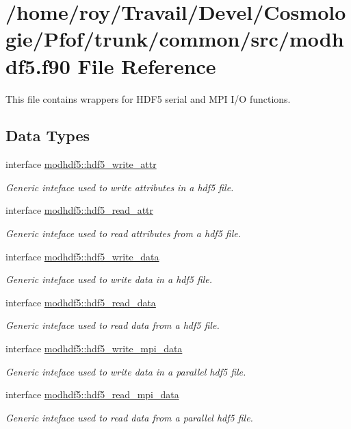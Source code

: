 \hypertarget{modhdf5_8f90}{}\section{/home/roy/\+Travail/\+Devel/\+Cosmologie/\+Pfof/trunk/common/src/modhdf5.f90 File Reference}
\label{modhdf5_8f90}


This file contains wrappers for H\+D\+F5 serial and M\+PI I/O functions.  


\subsection*{Data Types}
\begin{DoxyCompactItemize}
\item 
interface \hyperlink{interfacemodhdf5_1_1hdf5__write__attr}{modhdf5\+::hdf5\+\_\+write\+\_\+attr}
\begin{DoxyCompactList}\small\item\em Generic inteface used to write attributes in a hdf5 file. \end{DoxyCompactList}\item 
interface \hyperlink{interfacemodhdf5_1_1hdf5__read__attr}{modhdf5\+::hdf5\+\_\+read\+\_\+attr}
\begin{DoxyCompactList}\small\item\em Generic inteface used to read attributes from a hdf5 file. \end{DoxyCompactList}\item 
interface \hyperlink{interfacemodhdf5_1_1hdf5__write__data}{modhdf5\+::hdf5\+\_\+write\+\_\+data}
\begin{DoxyCompactList}\small\item\em Generic inteface used to write data in a hdf5 file. \end{DoxyCompactList}\item 
interface \hyperlink{interfacemodhdf5_1_1hdf5__read__data}{modhdf5\+::hdf5\+\_\+read\+\_\+data}
\begin{DoxyCompactList}\small\item\em Generic inteface used to read data from a hdf5 file. \end{DoxyCompactList}\item 
interface \hyperlink{interfacemodhdf5_1_1hdf5__write__mpi__data}{modhdf5\+::hdf5\+\_\+write\+\_\+mpi\+\_\+data}
\begin{DoxyCompactList}\small\item\em Generic inteface used to write data in a parallel hdf5 file. \end{DoxyCompactList}\item 
interface \hyperlink{interfacemodhdf5_1_1hdf5__read__mpi__data}{modhdf5\+::hdf5\+\_\+read\+\_\+mpi\+\_\+data}
\begin{DoxyCompactList}\small\item\em Generic inteface used to read data from a parallel hdf5 file. \end{DoxyCompactList}\end{DoxyCompactItemize}

